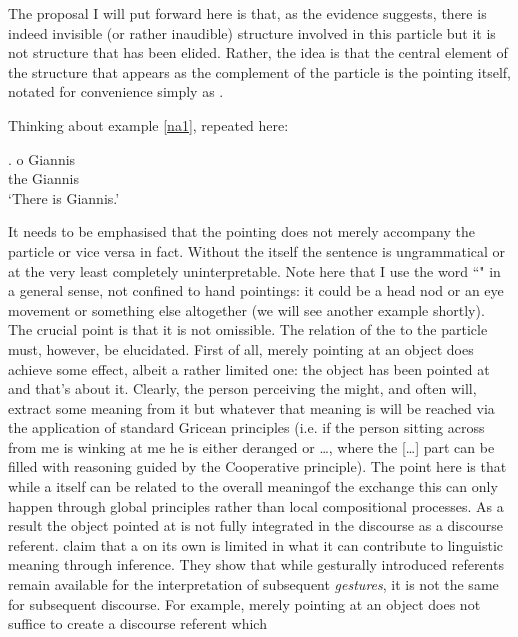\documentclass[output=paper]{LSP/langsci}
\begin{document}
The proposal I will put forward here is that, as the evidence suggests, there is indeed invisible (or rather inaudible) structure involved in this particle but it is not structure that has been elided.  Rather, the idea is that the central element of the structure that appears as the complement of the particle is the pointing  itself, notated for convenience simply as \xspace\Pointinghand.   

Thinking about example \ref{na1}, repeated here:

\exg.
\na \xspace\Pointinghand o Giannis\\
\na \xspace\Pointinghand the Giannis\\
\glt `There is Giannis.'

It needs to be emphasised that the pointing  does not merely
accompany the particle or vice versa in fact. Without the 
itself the sentence is ungrammatical or at the very least completely
uninterpretable.  Note here that I use the word ``" in a general
sense, not confined to hand pointings: it could be a head nod or an
eye movement or something else altogether (we will see another example
shortly).  The crucial point is that it is not omissible. The relation
of the  to the particle must, however, be elucidated.  First of
all, merely pointing at an object does achieve some effect, albeit a
rather limited one: the object has been pointed at and that's about
it.  Clearly, the {person} perceiving the  might, and often will,
extract some meaning from it but whatever that meaning is will be
reached via the application of standard Gricean principles (i.e. if
the {person} sitting across from me is winking at me he is either
deranged or \ldots, where the [\dots] part can be filled with
reasoning guided by the Cooperative principle).  The point here is
that while a  itself can be related to the overall meaning\pagebreak[4] of
the exchange this can only happen through global  principles
rather than local compositional processes.  As a result the object
pointed at is not fully integrated in the
discourse as a discourse referent. \citet{lascarides-stone:09} claim that a  on its own
is limited in what it can contribute to linguistic meaning through
inference.  They show that while gesturally introduced referents remain
available for the interpretation of subsequent \textit{gestures}, it
is not the same for subsequent discourse. For example, merely pointing
at an object does not suffice to create a discourse referent which
\end{document}
